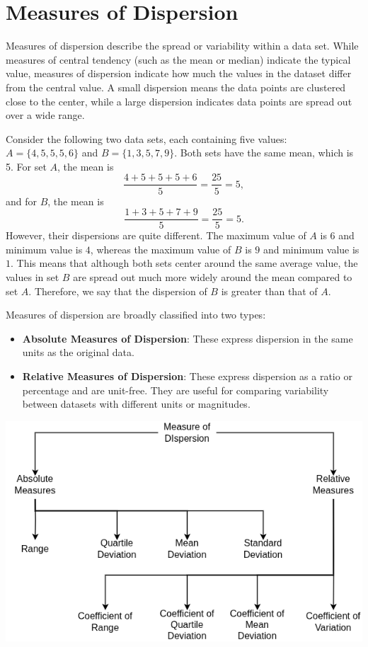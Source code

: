 \documentclass[twoside]{book}
\begin{document}

\section{Measures of Dispersion}

Measures of dispersion describe the spread or variability within a data set. While measures of central tendency (such as the mean or median) indicate the typical value, measures of dispersion indicate how much the values in the dataset differ from the central value. A small dispersion means the data points are clustered close to the center, while a large dispersion indicates data points are spread out over a wide range.

Consider the following two data sets, each containing five values:
$A = \{4, 5, 5, 5, 6\}$ and $B = \{1, 3, 5, 7, 9\}$.  
Both sets have the same mean, which is 5. For set $A$, the mean is
\[
\frac{4 + 5 + 5 + 5 + 6}{5} = \frac{25}{5} = 5,
\]
and for $B$, the mean is  
\[
\frac{1 + 3 + 5 + 7 + 9}{5} = \frac{25}{5} = 5.
\]
However, their dispersions are quite different. The maximum value of $A$ is $6$ and minimum value is $4$, whereas the maximum value of $B$ is $9$ and minimum value is $1$. This means that although both sets center around the same average value, the values in set $B$ are spread out much more widely around the mean compared to set $A$. Therefore, we say that the dispersion of $B$ is greater than that of $A$.


Measures of dispersion are broadly classified into two types:
\begin{itemize}
    \item \textbf{Absolute Measures of Dispersion}: These express dispersion in the same units as the original data.
    \item \textbf{Relative Measures of Dispersion}: These express dispersion as a ratio or percentage and are unit-free. They are useful for comparing variability between datasets with different units or magnitudes.
\end{itemize}

\begin{center}
    \includegraphics[scale=0.5]{pic/mod.drawio.png}
\end{center}
\end{document}
